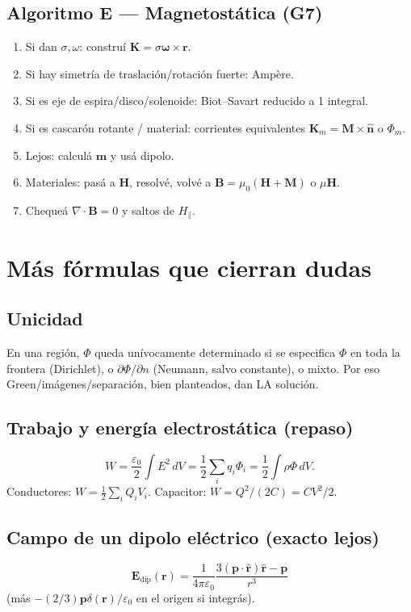 \documentclass[10pt,a4paper]{article}
\newcommand{\vect}[1]{\mathbf{#1}}
\newcommand{\uv}[1]{\hat{\mathbf{#1}}}
\newcommand{\epso}{\varepsilon_0}
\newcommand{\muo}{\mu_0}
\begin{document}
\subsection{Algoritmo E --- Magnetostática (G7)}
\begin{enumerate}
\item Si dan $\sigma,\omega$: construí $\vect{K}=\sigma\boldsymbol{\omega}\times\vect{r}$.
\item Si hay simetría de traslación/rotación fuerte: Ampère.
\item Si es eje de espira/disco/solenoide: Biot--Savart reducido a 1 integral.
\item Si es cascarón rotante / material: corrientes equivalentes $\vect{K}_m=\vect{M}\times\uv{n}$ o $\Phi_m$.
\item Lejos: calculá $\vect{m}$ y usá dipolo.
\item Materiales: pasá a $\vect{H}$, resolvé, volvé a $\vect{B}=\muo(\vect{H}+\vect{M})$ o $\mu\vect{H}$.
\item Chequeá $\nabla\cdot\vect{B}=0$ y saltos de $H_\parallel$.
\end{enumerate}

\section{Más fórmulas que cierran dudas}

\subsection{Unicidad}
En una región, $\Phi$ queda unívocamente determinado si se especifica $\Phi$ en toda la frontera (Dirichlet), o $\partial\Phi/\partial n$ (Neumann, salvo constante), o mixto. Por eso Green/imágenes/separación, bien planteados, dan LA solución.

\subsection{Trabajo y energía electrostática (repaso)}
\[
W=\frac{\epso}{2}\int E^2\,dV=\frac12\sum_i q_i\Phi_i
=\frac12\int\rho\Phi\,dV.
\]
Conductores: $W=\frac12\sum_i Q_i V_i$. Capacitor: $W=Q^2/(2C)=CV^2/2$.

\subsection{Campo de un dipolo eléctrico (exacto lejos)}
\[
\vect{E}_{\mathrm{dip}}(\vect{r})=\frac{1}{4\pi\epso}\frac{3(\vect{p}\cdot\uv{r})\uv{r}-\vect{p}}{r^3}
\]
(más $-(2/3)\vect{p}\delta(\vect{r})/\epso$ en el origen si integrás).
\end{document}
